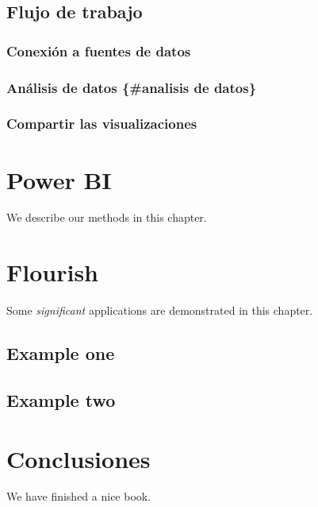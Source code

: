 \documentclass[
]{book}
\begin{document}
\hypertarget{flujo-de-trabajo}{%
\section{Flujo de trabajo}\label{flujo-de-trabajo}}

\hypertarget{conexiuxf3n-a-fuentes-de-datos}{%
\subsection{Conexión a fuentes de datos}\label{conexiuxf3n-a-fuentes-de-datos}}

\hypertarget{anuxe1lisis-de-datos-analisis-de-datos}{%
\subsection{Análisis de datos \{\#analisis de datos\}}\label{anuxe1lisis-de-datos-analisis-de-datos}}

\hypertarget{compartir-las-visualizaciones}{%
\subsection{Compartir las visualizaciones}\label{compartir-las-visualizaciones}}

\hypertarget{powerbi}{%
\chapter{Power BI}\label{powerbi}}

We describe our methods in this chapter.

\hypertarget{flourish}{%
\chapter{Flourish}\label{flourish}}

Some \emph{significant} applications are demonstrated in this chapter.

\hypertarget{example-one}{%
\section{Example one}\label{example-one}}

\hypertarget{example-two}{%
\section{Example two}\label{example-two}}

\hypertarget{conclu}{%
\chapter{Conclusiones}\label{conclu}}

We have finished a nice book.

  
\end{document}
